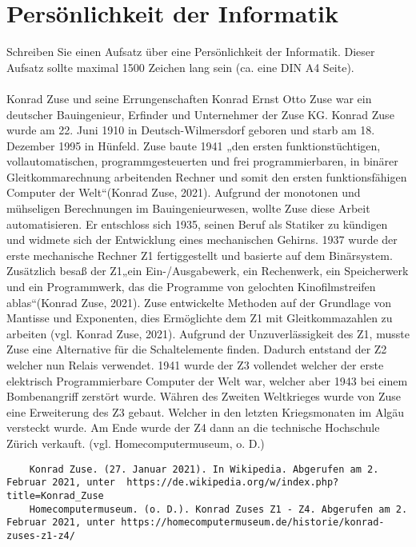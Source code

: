 \section{Persönlichkeit der Informatik}
Schreiben Sie einen Aufsatz über eine Persönlichkeit der Informatik. Dieser Aufsatz sollte maximal 1500 Zeichen lang sein (ca. eine DIN A4 Seite).\\
\\
Konrad Zuse und seine Errungenschaften
Konrad Ernst Otto Zuse war ein deutscher Bauingenieur, Erfinder und Unternehmer der Zuse KG. Konrad Zuse wurde am 22. Juni 1910 in Deutsch-Wilmersdorf geboren und starb am 18. Dezember 1995 in Hünfeld. Zuse baute 1941 „den ersten funktionstüchtigen, vollautomatischen, programmgesteuerten und frei programmierbaren, in binärer Gleitkommarechnung arbeitenden Rechner und somit den ersten funktionsfähigen Computer der Welt“(Konrad Zuse, 2021).
Aufgrund der monotonen und mühseligen Berechnungen im Bauingenieurwesen, wollte Zuse diese Arbeit automatisieren. Er entschloss sich 1935, seinen Beruf als Statiker zu kündigen und widmete sich der Entwicklung eines mechanischen Gehirns. 1937 wurde der erste mechanische Rechner Z1 fertiggestellt und basierte auf dem Binärsystem. Zusätzlich besaß der Z1„ein Ein-/Ausgabewerk, ein Rechenwerk, ein Speicherwerk und ein Programmwerk, das die Programme von gelochten Kinofilmstreifen ablas“(Konrad Zuse, 2021). Zuse entwickelte Methoden auf der Grundlage von Mantisse und Exponenten, dies Ermöglichte dem Z1 mit Gleitkommazahlen zu arbeiten (vgl. Konrad Zuse, 2021). Aufgrund der Unzuverlässigkeit des Z1, musste Zuse eine Alternative für die Schaltelemente finden.  Dadurch entstand der Z2 welcher nun Relais verwendet. 1941 wurde der Z3 vollendet welcher der erste elektrisch Programmierbare Computer der Welt war, welcher aber 1943 bei einem Bombenangriff zerstört wurde. Währen des Zweiten Weltkrieges wurde von Zuse eine Erweiterung des Z3 gebaut. Welcher in den letzten Kriegsmonaten im Algäu versteckt wurde. Am Ende wurde der Z4 dann an die technische Hochschule Zürich verkauft. (vgl. Homecomputermuseum, o. D.)

\begin{lstlisting}
	Konrad Zuse. (27. Januar 2021). In Wikipedia. Abgerufen am 2. Februar 2021, unter  https://de.wikipedia.org/w/index.php?title=Konrad_Zuse
	Homecomputermuseum. (o. D.). Konrad Zuses Z1 - Z4. Abgerufen am 2. Februar 2021, unter https://homecomputermuseum.de/historie/konrad-zuses-z1-z4/
\end{lstlisting}